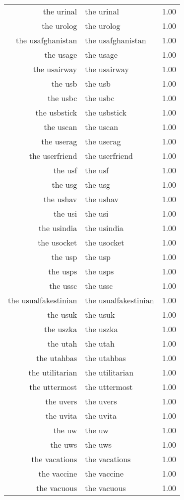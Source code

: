 \begin{table}[ht]
\begin{tabular}{rlr}
  the urinal & the urinal & 1.00 \\ 
  the urolog & the urolog & 1.00 \\ 
  the usafghanistan & the usafghanistan & 1.00 \\ 
  the usage & the usage & 1.00 \\ 
  the usairway & the usairway & 1.00 \\ 
  the usb & the usb & 1.00 \\ 
  the usbc & the usbc & 1.00 \\ 
  the usbstick & the usbstick & 1.00 \\ 
  the uscan & the uscan & 1.00 \\ 
  the userag & the userag & 1.00 \\ 
  the userfriend & the userfriend & 1.00 \\ 
  the usf & the usf & 1.00 \\ 
  the usg & the usg & 1.00 \\ 
  the ushav & the ushav & 1.00 \\ 
  the usi & the usi & 1.00 \\ 
  the usindia & the usindia & 1.00 \\ 
  the usocket & the usocket & 1.00 \\ 
  the usp & the usp & 1.00 \\ 
  the usps & the usps & 1.00 \\ 
  the ussc & the ussc & 1.00 \\ 
  the usualfakestinian & the usualfakestinian & 1.00 \\ 
  the usuk & the usuk & 1.00 \\ 
  the uszka & the uszka & 1.00 \\ 
  the utah & the utah & 1.00 \\ 
  the utahbas & the utahbas & 1.00 \\ 
  the utilitarian & the utilitarian & 1.00 \\ 
  the uttermost & the uttermost & 1.00 \\ 
  the uvers & the uvers & 1.00 \\ 
  the uvita & the uvita & 1.00 \\ 
  the uw & the uw & 1.00 \\ 
  the uws & the uws & 1.00 \\ 
  the vacations & the vacations & 1.00 \\ 
  the vaccine & the vaccine & 1.00 \\ 
  the vacuous & the vacuous & 1.00 \\ 

\end{tabular}
\end{table}
